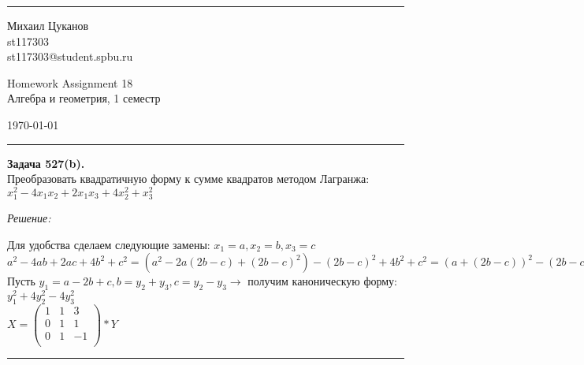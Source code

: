 \documentclass[a4paper, 12pt]{article}
\newenvironment{problem}[2][Задача]
    { \begin{mdframed}[backgroundcolor=gray!10] \textbf{#1 #2.} \\}
    {  \end{mdframed}}
\newenvironment{solution}
    {\textit{Решение: }}
    {\noindent\rule{7in}{1.5pt}}
\begin{document}

\fancyhead[C]{}
\hrule \medskip %
\begin{minipage}{0.295\textwidth}
\raggedright\footnotesize
Михаил Цуканов \hfill\\
st117303 \hfill\\
st117303@student.spbu.ru
\end{minipage}
\begin{minipage}{0.4\textwidth}
\centering\large
Homework Assignment 18\\
\normalsize
Алгебра и геометрия, 1 семестр\\
\end{minipage}
\begin{minipage}{0.295\textwidth}
\raggedleft
\today\hfill\\
\end{minipage}
\medskip\hrule
\bigskip




\begin{problem}{527(b)}
Преобразовать квадратичную форму к сумме квадратов методом Лагранжа: $x_1^2 - 4 x_1 x_2 + 2 x_1 x_3 + 4 x_2^2 + x_3^2$
\end{problem}
\begin{solution}

Для удобства сделаем следующие замены: $x_1=a,x_2=b,x_3=c$
\\
$a^2-4ab+2ac+4b^2+c^2=(a^2-2a(2b-c)+(2b-c)^2)-(2b-c)^2+4b^2+c^2=(a+(2b-c))^2-(2b-c)^2+4b^2+c^2=(a-(2b-c))^2+4bc$
\\
Пусть $y_1=a-2b+c,b=y_2+y_3,c=y_2-y_3 \rightarrow$ получим каноническую форму:
\\
$y_1^2+4y_2^2-4y_3^2$
\\
$X=
\left(
\begin{array}{ccc}
1 & 1 &3 \\
0 & 1 & 1 \\
0 & 1 & -1 \\
\end{array}
\right)*Y
$

\end{solution}
\end{document}
